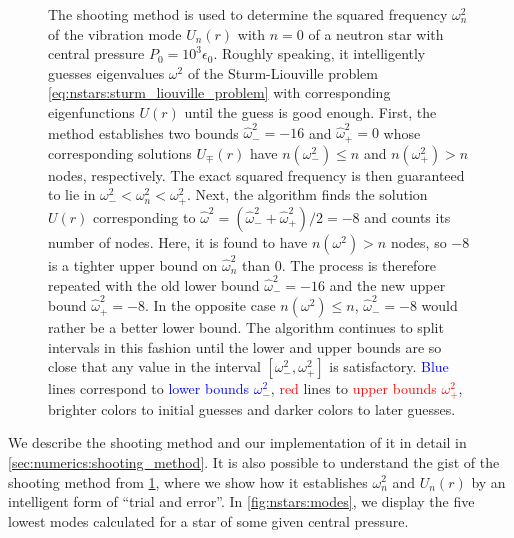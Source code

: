\begin{figure}
\caption{\label{fig:nstars:shooting_convergence}%
	The shooting method is used to determine the squared frequency $\omega_n^2$ of the vibration mode $U_n(r)$ with $n=0$ of a neutron star with central pressure $P_0 = 10^3 \epsilon_0$.
	Roughly speaking, it intelligently guesses eigenvalues $\omega^2$ of the Sturm-Liouville problem \eqref{eq:nstars:sturm_liouville_problem} with corresponding eigenfunctions $U(r)$ until the guess is good enough.
	First, the method establishes two bounds $\hat{\omega}_-^2 = -16$ and $\hat{\omega}_+^2 = 0$ whose corresponding solutions $U_\mp(r)$ have $n(\omega_-^2) \leq n$ and $n(\omega_+^2) > n$ nodes, respectively.
	The exact squared frequency is then guaranteed to lie in $\omega_-^2 < \omega_n^2 < \omega_+^2$.
	Next, the algorithm finds the solution $U(r)$ corresponding to $\hat{\omega}^2 = (\hat{\omega}_-^2 + \hat{\omega}_+^2) / 2 = -8$ and counts its number of nodes.
	Here, it is found to have $n(\omega^2) > n$ nodes, so $-8$ is a tighter upper bound on $\hat{\omega}_n^2$ than $0$.
	The process is therefore repeated with the old lower bound $\hat{\omega}_-^2 = -16$ and the new upper bound $\hat{\omega}_+^2 = -8$.
	In the opposite case $n(\omega^2) \leq n$, $\hat{\omega}_-^2 = -8$ would rather be a better lower bound.
	The algorithm continues to split intervals in this fashion until the lower and upper bounds are so close that any value in the interval $[\omega_-^2, \omega_+^2]$ is satisfactory.
	\textcolor{blue}{Blue} lines correspond to \textcolor{blue}{lower bounds $\omega_-^2$}, \textcolor{red}{red} lines to \textcolor{red}{upper bounds $\omega_+^2$}, brighter colors to initial guesses and darker colors to later guesses.
}
\end{figure}

We describe the shooting method and our implementation of it in detail in \cref{sec:numerics:shooting_method}.
It is also possible to understand the gist of the shooting method from \cref{fig:nstars:shooting_convergence}, where we show how it establishes $\omega_n^2$ and $U_n(r)$ by an intelligent form of ``trial and error''.
In \cref{fig:nstars:modes}, we display the five lowest modes calculated for a star of some given central pressure.

